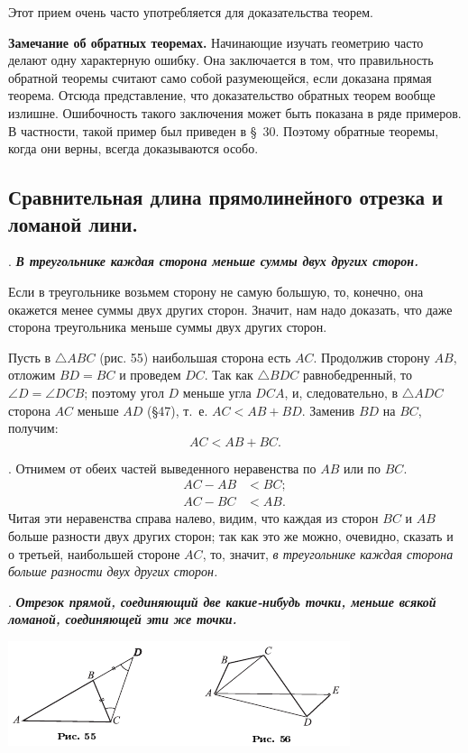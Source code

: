 \documentclass[oneside]{book}
\begin{document}
Этот прием очень часто употребляется для доказательства теорем.

\textbf{Замечание об обратных теоремах.}
Начинающие изучать геометрию часто делают одну характерную ошибку.
Она заключается в том, что правильность обратной теоремы считают само собой разумеющейся, если доказана прямая теорема.
Отсюда представление, что доказательство обратных теорем вообще излишне.
Ошибочность такого заключения может быть показана в ряде примеров.
В частности, такой пример был приведен в §~30.
Поэтому обратные теоремы, когда они верны, всегда доказываются особо.



\subsection*{Сравнительная длина прямолинейного отрезка и ломаной лини.}

.
\textbf{\emph{В треугольнике каждая сторона меньше суммы двух других сторон.}}

Если в треугольнике возьмем сторону не самую большую, то, конечно, она окажется менее суммы двух других сторон.
Значит, нам надо доказать, что даже  сторона треугольника меньше суммы двух других сторон.

Пусть в $\triangle ABC$ (рис. 55) наибольшая сторона есть $AC$.
Продолжив сторону $AB$, отложим $BD=BC$ и проведем $DC$.
Так как $\triangle BDC$ равнобедренный, то $\angle D = \angle DCB$;
поэтому угол $D$ меньше угла $DCA$, и, следовательно, в $\triangle ADC$ сторона $AC$ меньше $AD$ (§47), т.~е.
$AC < AB + BD$.
Заменив $BD$ на $BC$, получим:
\[AC < AB + BC.\]

.
Отнимем от обеих частей выведенного неравенства по $AB$ или по $BC$.
\begin{align*}
AC-AB&<BC;
\\
AC-BC&<AB.
\end{align*}
Читая эти неравенства справа налево, видим, что каждая из сторон $BC$ и $AB$ больше разности двух других сторон;
так как это же можно, очевидно, сказать и о третьей, наибольшей стороне $AC$, то, значит, \emph{в треугольнике каждая сторона больше разности двух других сторон.}


.
\textbf{\emph{Отрезок прямой, соединяющий две какие-нибудь точки, меньше всякой ломаной, соединяющей эти же точки.}}

\includegraphics{pics/ris-55-56}
\end{document}

